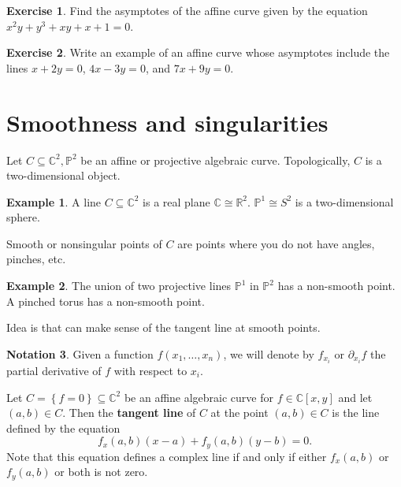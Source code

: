 \documentclass{article}
\newcommand{\R}{\mathbb{R}}
\newcommand{\C}{\mathbb{C}}
\renewcommand{\P}{\mathbb{P}}
\newcommand{\rb}[1]{\left( #1 \right)}
\renewcommand{\sb}[1]{\left[ #1 \right]}
\newcommand{\cb}[1]{\left\{ #1 \right\}}
\theoremstyle{definition}\newtheorem{definition}{Definition}[section]
\theoremstyle{definition}\newtheorem{notation}[definition]{Notation}
\theoremstyle{definition}\newtheorem{remark}[definition]{Remark}
\theoremstyle{definition}\newtheorem{example}[definition]{Example}
\theoremstyle{definition}\newtheorem{fact}{Fact}
\theoremstyle{definition}\newtheorem{exercise}{Exercise}
\begin{document}
\begin{exercise}
Find the asymptotes of the affine curve given by the equation $ x^2y + y^3 + xy + x + 1 = 0 $.
\end{exercise}

\begin{exercise}
Write an example of an affine curve whose asymptotes include the lines $ x + 2y = 0 $, $ 4x - 3y = 0 $, and $ 7x + 9y = 0 $.
\end{exercise}


\section{Smoothness and singularities}

Let $ C \subseteq \C^2, \P^2 $ be an affine or projective algebraic curve. Topologically, $ C $ is a two-dimensional object.

\begin{example}
A line $ C \subseteq \C^2 $ is a real plane $ \C \cong \R^2 $. $ \P^1 \cong S^2 $ is a two-dimensional sphere.
\end{example}

Smooth or nonsingular points of $ C $ are points where you do not have angles, pinches, etc.

\begin{example}
The union of two projective lines $ \P^1 $ in $ \P^2 $ has a non-smooth point. A pinched torus has a non-smooth point.
\end{example}

Idea is that can make sense of the tangent line at smooth points.

\begin{notation}
Given a function $ f\rb{x_1, \dots, x_n} $, we will denote by $ f_{x_i} $ or $ \partial_{x_i}f $ the partial derivative of $ f $ with respect to $ x_i $.
\end{notation}

Let $ C = \cb{f = 0} \subseteq \C^2 $ be an affine algebraic curve for $ f \in \C\sb{x, y} $ and let $ \rb{a, b} \in C $. Then the \textbf{tangent line} of $ C $ at the point $ \rb{a, b} \in C $ is the line defined by the equation
$$ f_x\rb{a, b}\rb{x - a} + f_y\rb{a, b}\rb{y - b} = 0. $$
Note that this equation defines a complex line if and only if either $ f_x\rb{a, b} $ or $ f_y\rb{a, b} $ or both is not zero.
\end{document}
